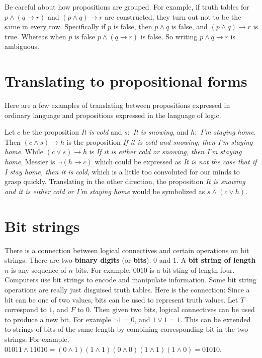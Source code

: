Be careful about  how propositions are grouped. For example, if
truth tables for $p\wedge (q\to r)$ and $(p\wedge q)\to r$ are constructed, they
turn out not to be the same in every row. Specifically if $p$ is false, then
$p\wedge q$ is false, and $(p\wedge q)\to r$ is true. Whereas when $p$ is false
$p\wedge (q\to r)$ is false. So writing $p\wedge q\to r$ is ambiguous.


\section{Translating to propositional forms}
Here are a few examples of translating between propositions expressed in ordinary 
language and propositions expressed in the language of logic.

\begin{exmp}
Let $c$ be the proposition {\itshape It is cold}
and $s :$  {\itshape It is snowing}, and $h :$  {\itshape I'm staying home}.
Then $(c\land s)\to h$ is the proposition {\itshape If it is cold and snowing, then
I'm staying home}. While $(c\lor s)\to h$ is {\itshape If it is either cold or 
snowing, then I'm staying home}. Messier is $\lnot (h\to c)$ which could be expressed
as {\itshape It is not the case that if I stay home, then
it is cold}, which is a little too convoluted for our minds to grasp quickly. Translating in the
other direction, the proposition {\itshape It is snowing and it is either 
cold or I'm staying home} would be symbolized as $s\land(c\lor h)$.  
\end{exmp}

\section{Bit strings}
There is a connection between logical connectives and certain 
operations on  bit strings. There are two {\bfseries binary digits} 
(or {\bfseries bits}):  $0$ and $1$. A {\bfseries bit string of length $n$} is any
sequence of $n$ bits. For example, $0010$ is a bit sting of length four.
Computers use bit strings to encode and manipulate information. Some bit string
operations are really just disguised truth tables. Here is the connection:
Since a bit can be one of two values, bits can be used to represent truth
values. Let $T$ correspond to $1$, and $F$ to $0$. Then given two bits,
logical connectives can be used to produce a new bit. For example $\lnot 1 = 0$, and
$1\lor 1 =1$.  This can be extended to strings of bits of the same length by
combining corresponding bit in the two strings. For example,
 $01011\wedge 11010=(0\wedge 1) (1\wedge 1) (0\wedge 0) (1\wedge 1) (1\wedge 0)=01010$.


